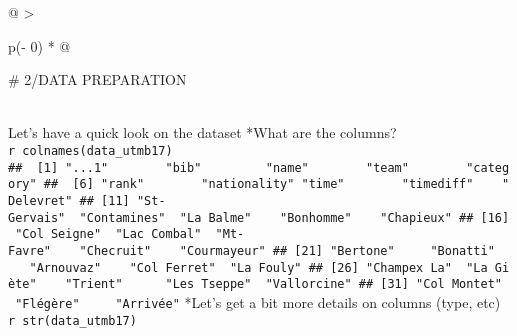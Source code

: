 \documentclass[
]{article}
\begin{document}
\begin{longtable}[]{@{}
  >{\raggedright\arraybackslash}p{(\columnwidth - 0\tabcolsep) * }@{}}
\toprule\noalign{}
\begin{minipage}[b]{\linewidth}\raggedright
\# 2/DATA PREPARATION
\end{minipage} \\
\midrule\noalign{}
\endhead
\bottomrule\noalign{}
\endlastfoot
Let's have a quick look on the dataset *What are the columns? \\
\texttt{r\ colnames(data\_utmb17)} \\
\texttt{\#\#\ \ {[}1{]}\ "...1"\ \ \ \ \ \ \ \ "bib"\ \ \ \ \ \ \ \ \ "name"\ \ \ \ \ \ \ \ "team"\ \ \ \ \ \ \ \ "category"\ \#\#\ \ {[}6{]}\ "rank"\ \ \ \ \ \ \ \ "nationality"\ "time"\ \ \ \ \ \ \ \ "timediff"\ \ \ \ "Delevret"\ \#\#\ {[}11{]}\ "St-Gervais"\ \ "Contamines"\ \ "La\ Balme"\ \ \ \ "Bonhomme"\ \ \ \ "Chapieux"\ \#\#\ {[}16{]}\ "Col\ Seigne"\ \ "Lac\ Combal"\ \ "Mt-Favre"\ \ \ \ "Checruit"\ \ \ \ "Courmayeur"\ \#\#\ {[}21{]}\ "Bertone"\ \ \ \ \ "Bonatti"\ \ \ \ \ "Arnouvaz"\ \ \ \ "Col\ Ferret"\ \ "La\ Fouly"\ \#\#\ {[}26{]}\ "Champex\ La"\ \ "La\ Giète"\ \ \ \ "Trient"\ \ \ \ \ \ "Les\ Tseppe"\ \ "Vallorcine"\ \#\#\ {[}31{]}\ "Col\ Montet"\ \ "Flégère"\ \ \ \ \ "Arrivée"}
*Let's get a bit more details on columns (type, etc) \\
\texttt{r\ str(data\_utmb17)} \\

\end{longtable}
\end{document}
